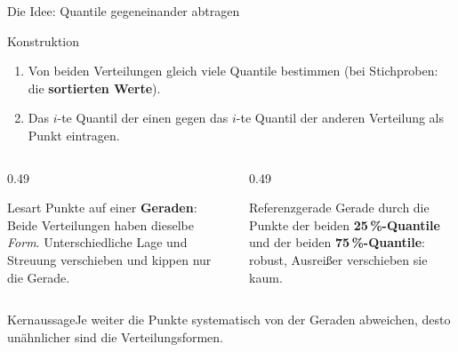 \documentclass[aspectratio=169,11pt]{beamer}
\newcommand{\kernaussage}[1]{\begin{alertblock}{Kernaussage}#1\end{alertblock}}
\begin{document}
\begin{frame}{Die Idee: Quantile gegeneinander abtragen}
  \small
  \begin{block}{Konstruktion}
    \begin{enumerate}
      \item Von beiden Verteilungen gleich viele Quantile bestimmen (bei
            Stichproben: die \textbf{sortierten Werte}).
      \item Das $i$-te Quantil der einen gegen das $i$-te Quantil der anderen
            Verteilung als Punkt eintragen.
    \end{enumerate}
  \end{block}

  \begin{columns}[T]
    \begin{column}{0.49\textwidth}
      \begin{exampleblock}{Lesart}
        Punkte auf einer \textbf{Geraden}: Beide Verteilungen haben dieselbe
        \emph{Form}. Unterschiedliche Lage und Streuung verschieben und kippen
        nur die Gerade.
      \end{exampleblock}
    \end{column}
    \begin{column}{0.49\textwidth}
      \begin{block}{Referenzgerade}
        Gerade durch die Punkte der beiden \textbf{25\,\%-Quantile} und der
        beiden \textbf{75\,\%-Quantile}: robust, Ausreißer verschieben sie kaum.
      \end{block}
    \end{column}
  \end{columns}

  \kernaussage{Je weiter die Punkte systematisch von der Geraden abweichen, desto
    unähnlicher sind die Verteilungsformen.}
\end{frame}
\end{document}
